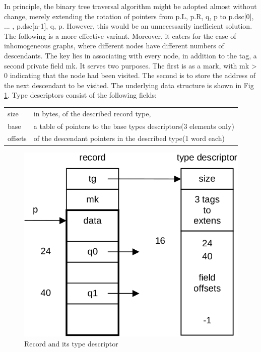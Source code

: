 In principle, the binary tree traversal algorithm might be adopted almost without change, merely
extending the rotation of pointers from p.L, p.R, q, p to p.dsc[0], ... , p.dsc[n-1], q, p. However, this
would be an unnecessarily inefficient solution. The following is a more effective variant. Moreover, it
caters for the case of inhomogeneous graphs, where different nodes have different numbers of
descendants. The key lies in associating with every node, in addition to the tag, a second private
field mk. It serves two purposes. The first is as a mark, with mk > 0 indicating that the node had
been visited. The second is to store the address of the next descendant to be visited. The
underlying data structure is shown in Fig \ref{fig:record}. Type descriptors consist of the following fields:
\begin{table}[h!]
	\centering
	\setlength{\tabcolsep}{2pt}
	\begin{tabular}{l l}
		size & {\small in bytes, of the described record type,} \\
		base & {\small a table of pointers to the base types descriptors(3 elements only)} \\
		{\small offsets} & {\small of the descendant pointers in the described type(1 word each)}
	\end{tabular}
\end{table}
\begin{figure}
	\label{fig:record}
	\centering
	\includegraphics[width=.9\textwidth]{i/x}
	\caption{Record and its type descriptor}
\end{figure}

